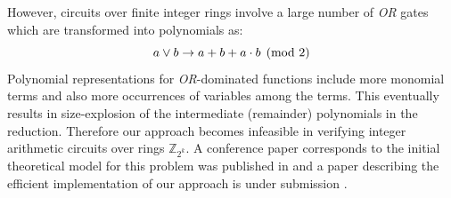 However, circuits over finite integer rings involve a large number of
{\it OR} gates which are transformed into polynomials as:  
\begin{equation}
a \vee b \rightarrow a+b+a\cdot b \pmod 2  \nonumber \\ 
\end{equation}
Polynomial representations for {\it OR}-dominated functions include
more monomial terms and also more occurrences of variables among the
terms. This eventually results in size-explosion of the intermediate
(remainder) polynomials in the reduction. Therefore our approach
becomes infeasible in verifying integer arithmetic circuits over rings
$\mathbb{Z}_{2^{k}}$.  
A conference paper corresponds to the initial theoretical model for this problem
was published in \cite{lv:vlsi2012} and 
a paper describing the efficient implementation of our approach is under submission \cite{lv:date2013}.

